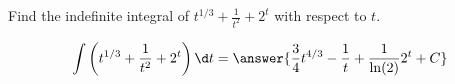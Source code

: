 \documentclass{ximera}
\author{Gregory Hartman \and Matthew Carr\and Nela Lakos}
\begin{document}
\begin{exercise}

Find the indefinite integral of $t^{1/3}+\frac{1}{t^2}+2^t$ with respect to $t$.
\begin{prompt}
  \[
  \int\left( t^{1/3}+\frac{1}{t^2}+2^t\right)\d t
  =\answer{\frac{3}{4}t^{4/3}-\frac{1}{t}+\frac{1}{\ln(2)}2^{t}+C}
  \]
\end{prompt}
\end{exercise}
\end{document}

